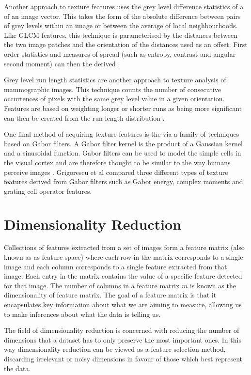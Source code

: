 Another approach to texture features uses the grey level difference statistics of a of an image vector. This takes the form of the absolute difference between pairs of grey levels within an image or between the average of local neighbourhoods. Like GLCM features, this technique is parameterised by the distances between the two image patches and the orientation of the distances used as an offset. First order statistics and measures of spread (such as entropy, contrast and angular second moment) can then the derived \cite{weszka1976comparative}.

Grey level run length statistics are another approach to texture analysis of mammographic images. This technique counts the number of consecutive occurrences of pixels with the same grey level value in a given orientation. Features are based on weighting longer or shorter runs as being more significant can then be created from the run length distribution \cite{weszka1976comparative, cheng2006approaches}.

One final method of acquiring texture features is the via a family of techniques based on Gabor filters. A Gabor filter kernel is the product of a Gaussian kernel and a  sinusoidal function. Gabor filters can be used to model the simple cells in the visual cortex and are therefore thought to be similar to the way humans perceive images \cite{marvcelja1980mathematical}. Grigorescu et al \cite{grigorescu2002comparison} compared three different types of texture features derived from Gabor filters such as Gabor energy, complex moments and grating cell operator features. 

\section{Dimensionality Reduction}
Collections of features extracted from a set of images form a feature matrix (also known as as feature space) where each row in the matrix corresponds to a single image and each column corresponds to a single feature extracted from that image. Each entry in the matrix contains the value of a specific feature detected for that image. The number of columns in a feature matrix $m$ is known as the dimensionality of feature matrix. The goal of a feature matrix is that it encapsulates key information about what we are aiming to measure, allowing us to make inferences about what the data is telling us.

The field of dimensionality reduction is concerned with reducing the number of dimensions that a dataset has to only preserve the most important ones. In this way dimensionality reduction can be viewed as a feature selection method, discarding irrelevant or noisy dimensions in favour of those which best represent the data.

